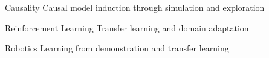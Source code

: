 


\begin{cvskills}


\cvskill
{Causality} %
{Causal model induction through simulation and exploration} %


\cvskill
{Reinforcement Learning} %
{Transfer learning and domain adaptation} %


\cvskill
{Robotics} %
{Learning from demonstration and transfer learning} %


\end{cvskills}